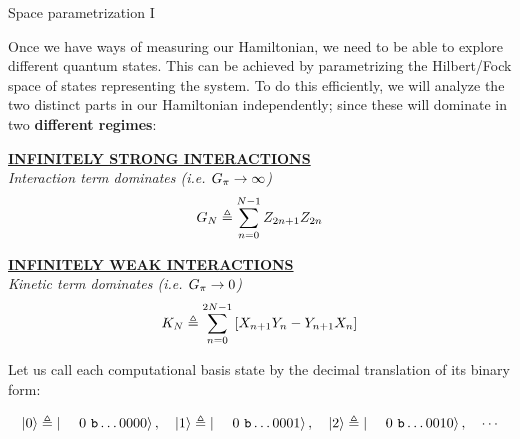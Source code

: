 \documentclass[9pt, aspectratio=169]{beamer}
\begin{document}
\begin{frame}{Space parametrization I}

	Once we have ways of measuring our Hamiltonian, we need to be able to explore different quantum states. This can be achieved by parametrizing the Hilbert/Fock space of states representing the system. To do this efficiently, we will analyze the two distinct parts in our Hamiltonian independently; since these will dominate in two \textbf{different regimes}:

	\begin{multicols}{2}

		\begin{center}
			\underline{\textbf{INFINITELY STRONG INTERACTIONS}}\\
			\small{\emph{Interaction term dominates (i.e. $G_{\pi} \rightarrow \infty$)}}
			\begin{gather*}
				G_{N} \triangleq \sum_{n=0}^{N-1} Z_{2n+1}Z_{2n}
			\end{gather*}
		\end{center}

		\columnbreak

		\begin{center}
			\underline{\textbf{INFINITELY WEAK INTERACTIONS}}\\
			\small{\emph{Kinetic term dominates (i.e. $G_{\pi} \rightarrow 0$)}}
			\begin{gather*}
			  K_{N} \triangleq \sum_{n=0}^{2N-1} \qty[ X_{n+1}Y_{n} - Y_{n+1}X_{n} ]
			\end{gather*}
		\end{center}

	\end{multicols}

	\pause

	Let us call each computational basis state by the decimal translation of its binary form:

	\begin{gather*}
	  \ket{0} \defeq \ket{\bin\dots0000} \qc
	  \ket{1} \defeq \ket{\bin\dots0001} \qc
	  \ket{2} \defeq \ket{\bin\dots0010} \qc
	  \cdots
	\end{gather*}

\end{frame}
\end{document}

